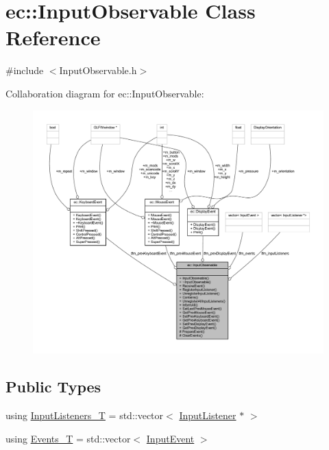 \hypertarget{classec_1_1_input_observable}{}\section{ec\+:\+:Input\+Observable Class Reference}
\label{classec_1_1_input_observable}


{\ttfamily \#include $<$Input\+Observable.\+h$>$}



Collaboration diagram for ec\+:\+:Input\+Observable\+:
\nopagebreak
\begin{figure}[H]
\begin{center}
\leavevmode
\includegraphics[width=350pt]{classec_1_1_input_observable__coll__graph}
\end{center}
\end{figure}
\subsection*{Public Types}
\begin{DoxyCompactItemize}
\item 
using \mbox{\hyperlink{classec_1_1_input_observable_a99717b2918621597db89d9ede34ddded}{Input\+Listeners\+\_\+T}} = std\+::vector$<$ \mbox{\hyperlink{classec_1_1_input_listener}{Input\+Listener}} $\ast$ $>$
\item 
using \mbox{\hyperlink{classec_1_1_input_observable_a9b63c8acbcbfc0f99d2964493ac52925}{Events\+\_\+T}} = std\+::vector$<$ \mbox{\hyperlink{structec_1_1_input_event}{Input\+Event}} $>$
\end{DoxyCompactItemize}
